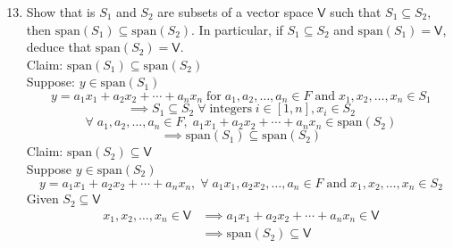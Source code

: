 \documentclass[letterpaper,12pt]{article}
\newcommand{\?}{\stackrel{?}{=}}
\begin{document}
\begin{spacing}{1.5}
\begin{enumerate}
\setcounter{enumi}{12}
\item Show that is $S_1$ and $S_2$ are subsets of a vector space
  $\mathsf{V}$ such that $S_1 \subseteq S_2$, then $\text{span}(S_1)
  \subseteq \text{span}(S_2)$. In particular, if $S_1\subseteq S_2$
  and $\text{span}(S_1) = \mathsf{V}$, deduce that $\text{span}(S_2) =
  \mathsf{V}$.\\
Claim: $\text{span}(S_1) \subseteq \text{span}(S_2)$\\
Suppose: $y \in \text{span}(S_1)$
\begin{equation}
y = a_1x_1 +a_2x_2 +\cdots+ a_nx_n \;\text{for}\; a_1,a_2,\dots,a_n
\in F\; \text{and}\; x_1,x_2,\dots,x_n \in S_1
\end{equation}
\begin{equation}
\implies S_1 \subseteq S_2\; \forall \;\text{integers}\; i \in [1,n],
x_i \in S_2
\end{equation}
\begin{equation}
\forall\; a_1,a_2,\dots,a_n \in F,\;
a_1x_1 +a_2x_2 +\cdots+ a_nx_n \in \text{span}(S_2)
\end{equation}
\begin{equation}
\implies \text{span}(S_1) \subseteq \text{span}(S_2)
\end{equation}
Claim: $\text{span}(S_2) \subseteq \mathsf{V}$
\\
Suppose $y \in \text{span}(S_2)$
\begin{equation}
y = a_1x_1 +a_2x_2 +\cdots+ a_nx_n, \; \forall \; a_1x_1
,a_2x_2,\dots,a_n \in F \; \text{and} \; x_1,x_2,\dots,x_n \in S_2
\end{equation}
Given $S_2 \subseteq \mathsf{V}$
\begin{align}
x_1,x_2,\dots,x_n \in \mathsf{V} &\implies a_1x_1 + a_2x_2 +\cdots+
a_nx_n \in \mathsf{V}\\
&\implies \text{span}(S_2) \subseteq \mathsf{V}
\end{align}
\end{enumerate}
\end{spacing}
\end{document}
